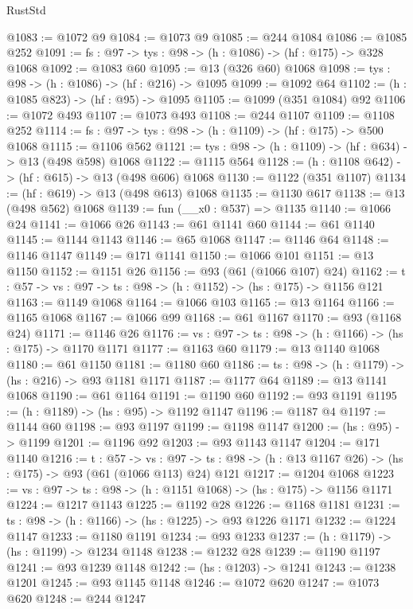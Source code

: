 \begin{lexlean}{RustStd}
\begin{coremodule}
@1083 := @1072 @9
@1084 := @1073 @9
@1085 := @244 @1084
@1086 := @1085 @252
@1091 := {fs : @97} -> {tys : @98} -> (h : @1086) -> (hf : @175) -> @328 @1068
@1092 := @1083 @60
@1095 := @13 (@326 @60) @1068
@1098 := {tys : @98} -> (h : @1086) -> (hf : @216) -> @1095
@1099 := @1092 @64
@1102 := (h : @1085 @823) -> (hf : @95) -> @1095
@1105 := @1099 (@351 @1084) @92
@1106 := @1072 @493
@1107 := @1073 @493
@1108 := @244 @1107
@1109 := @1108 @252
@1114 := {fs : @97} -> {tys : @98} -> (h : @1109) -> (hf : @175) -> @500 @1068
@1115 := @1106 @562
@1121 := {tys : @98} -> (h : @1109) -> (hf : @634) -> @13 (@498 @598) @1068
@1122 := @1115 @564
@1128 := (h : @1108 @642) -> (hf : @615) -> @13 (@498 @606) @1068
@1130 := @1122 (@351 @1107)
@1134 := (hf : @619) -> @13 (@498 @613) @1068
@1135 := @1130 @617
@1138 := @13 (@498 @562) @1068
@1139 := fun (__x0 : @537) => @1135
@1140 := @1066 @24
@1141 := @1066 @26
@1143 := @61 @1141 @60
@1144 := @61 @1140
@1145 := @1144 @1143
@1146 := @65 @1068
@1147 := @1146 @64
@1148 := @1146 @1147
@1149 := @171 @1141
@1150 := @1066 @101
@1151 := @13 @1150
@1152 := @1151 @26
@1156 := @93 (@61 (@1066 @107) @24)
@1162 := {t : @57} -> {vs : @97} -> {ts : @98} -> (h : @1152) -> (hs : @175) -> @1156 @121
@1163 := @1149 @1068
@1164 := @1066 @103
@1165 := @13 @1164
@1166 := @1165 @1068
@1167 := @1066 @99
@1168 := @61 @1167
@1170 := @93 (@1168 @24)
@1171 := @1146 @26
@1176 := {vs : @97} -> {ts : @98} -> (h : @1166) -> (hs : @175) -> @1170 @1171
@1177 := @1163 @60
@1179 := @13 @1140 @1068
@1180 := @61 @1150
@1181 := @1180 @60
@1186 := {ts : @98} -> (h : @1179) -> (hs : @216) -> @93 @1181 @1171
@1187 := @1177 @64
@1189 := @13 @1141 @1068
@1190 := @61 @1164
@1191 := @1190 @60
@1192 := @93 @1191
@1195 := (h : @1189) -> (hs : @95) -> @1192 @1147
@1196 := @1187 @4
@1197 := @1144 @60
@1198 := @93 @1197
@1199 := @1198 @1147
@1200 := (hs : @95) -> @1199
@1201 := @1196 @92
@1203 := @93 @1143 @1147
@1204 := @171 @1140
@1216 := {t : @57} ->
  {vs : @97} -> {ts : @98} -> (h : @13 @1167 @26) -> (hs : @175) -> @93 (@61 (@1066 @113) @24) @121
@1217 := @1204 @1068
@1223 := {vs : @97} -> {ts : @98} -> (h : @1151 @1068) -> (hs : @175) -> @1156 @1171
@1224 := @1217 @1143
@1225 := @1192 @28
@1226 := @1168 @1181
@1231 := {ts : @98} -> (h : @1166) -> (hs : @1225) -> @93 @1226 @1171
@1232 := @1224 @1147
@1233 := @1180 @1191
@1234 := @93 @1233
@1237 := (h : @1179) -> (hs : @1199) -> @1234 @1148
@1238 := @1232 @28
@1239 := @1190 @1197
@1241 := @93 @1239 @1148
@1242 := (hs : @1203) -> @1241
@1243 := @1238 @1201
@1245 := @93 @1145 @1148
@1246 := @1072 @620
@1247 := @1073 @620
@1248 := @244 @1247

\end{coremodule}
\end{lexlean}

